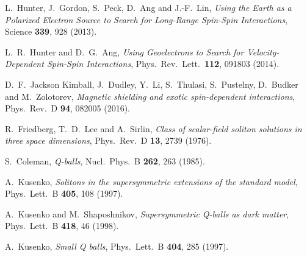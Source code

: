 \documentclass[aps,prd,onecolumn,nofootinbib]{revtex4-2} %
\begin{document}
\begin{thebibliography}{99}
 L.~Hunter, J.~Gordon, S.~Peck, D.~Ang and J.-F.~Lin, \textit{Using the Earth as a Polarized Electron Source to Search for Long-Range Spin-Spin Interactions}, Science \textbf{339}, 928 (2013). 

 L.~R.~Hunter and D.~G.~Ang, \textit{Using Geoelectrons to Search for Velocity-Dependent Spin-Spin Interactions}, Phys.~Rev.~Lett.~\textbf{112}, 091803 (2014). 

 D.~F.~Jackson Kimball, J.~Dudley, Y.~Li, S.~Thulasi, S.~Pustelny, D.~Budker and M.~Zolotorev, \textit{Magnetic shielding and exotic spin-dependent interactions}, Phys.~Rev.~D \textbf{94}, 082005 (2016). 


 R.~Friedberg, T.~D.~Lee and A.~Sirlin, \textit{Class of scalar-field soliton solutions in three space dimensions}, Phys.~Rev.~D \textbf{13}, 2739 (1976). 

 S.~Coleman, \textit{Q-balls}, Nucl.~Phys.~B \textbf{262}, 263 (1985). 

 A.~Kusenko, \textit{Solitons in the supersymmetric extensions of the standard model}, Phys.~Lett.~B \textbf{405}, 108 (1997). 

 A.~Kusenko and M.~Shaposhnikov, \textit{Supersymmetric Q-balls as dark matter}, Phys.~Lett.~B \textbf{418}, 46 (1998). 

 A.~Kusenko, \textit{Small Q balls}, Phys.~Lett.~B \textbf{404}, 285 (1997). 






\end{thebibliography}


\end{document}
